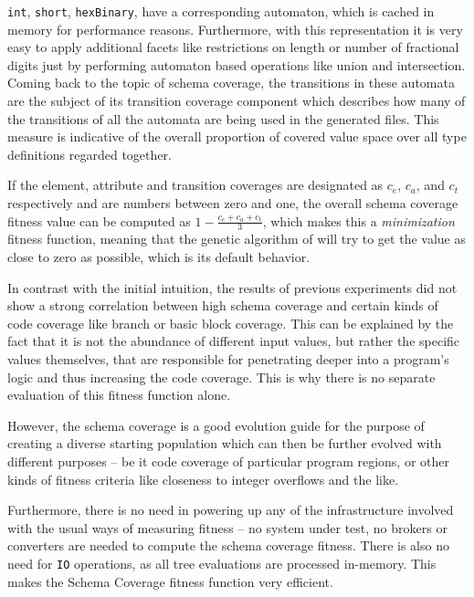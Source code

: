 \begin{description}
  \texttt{int}, \texttt{short}, \texttt{hexBinary}, have a corresponding automaton, which is cached in memory
  for performance reasons. Furthermore, with this representation it is very easy to apply additional facets
  like restrictions on length or number of fractional digits just by performing automaton based operations
  like union and intersection.
  Coming back to the topic of schema coverage, the transitions in these automata are the subject of its 
  transition coverage component which describes how many of the transitions of all the automata are being 
  used in the generated \xml files. This measure is indicative of the overall proportion of covered value space 
  over all type definitions regarded together.
\end{description}

If the element, attribute and transition coverages are designated as $c_e$, $c_a$, and $c_t$ respectively and
are numbers between zero and one, the overall schema coverage fitness value can be computed as $1 -
\frac{c_e+c_a+c_t}{3}$, which makes this a \emph{minimization} fitness function, meaning that the genetic
algorithm of \evosuite will try to get the value as close to zero as possible, which is its default behavior.

In contrast with the initial intuition, the results of previous experiments did not 
show a strong correlation between high schema coverage and certain kinds of code coverage like 
branch or basic block coverage. This can be explained by the fact that it is not the abundance of different 
input values, but rather the specific values themselves, that are responsible for penetrating deeper into a 
program's logic and thus increasing the code coverage. This is why there is no separate evaluation of this
fitness function alone.

However, the schema coverage is a good evolution guide for the purpose of creating a diverse starting population
which can then be further evolved with different purposes -- be it code coverage of particular program regions, or
other kinds of fitness criteria like closeness to integer overflows and the like.

Furthermore, there is no need in powering up any of the infrastructure involved with the usual ways of
measuring fitness -- no system under test, no brokers or converters are needed to compute the schema coverage
fitness. There is also no need for \texttt{IO} operations, as all \xml tree evaluations are processed
in-memory. This makes the Schema Coverage fitness function very efficient.


